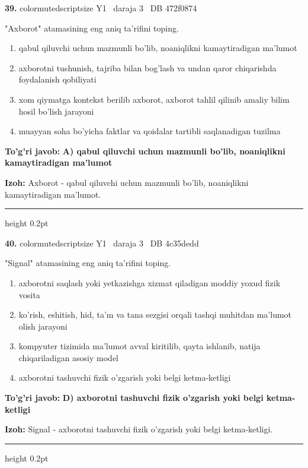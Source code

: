 \documentclass[10pt,a4paper,oneside]{article}
\begin{document}
\noindent\textbf{\color{ink}39.}  {color{muted}scriptsize Y1 \textbullet\ daraja 3 \textbullet\ DB 472f0874}
\par
"Axborot" atamasining eng aniq ta'rifini toping.
\begin{enumerate}[label=\Alph*),leftmargin=9mm]
\item qabul qiluvchi uchun mazmunli bo'lib, noaniqlikni kamaytiradigan ma'lumot
\item axborotni tushunish, tajriba bilan bog'lash va undan qaror chiqarishda foydalanish qobiliyati
\item xom qiymatga kontekst berilib axborot, axborot tahlil qilinib amaliy bilim hosil bo'lish jarayoni
\item muayyan soha bo'yicha faktlar va qoidalar tartibli saqlanadigan tuzilma
\end{enumerate}
\begin{tcolorbox}[enhanced,breakable,colback=teal!4,colframe=teal!50!black,boxrule=0.5pt,arc=1.1mm,left=3mm,right=3mm,top=1.7mm,bottom=1.7mm,before skip=2mm,after skip=2mm]
\textbf{\color{teal}To'g'ri javob:} \textbf{A) qabul qiluvchi uchun mazmunli bo'lib, noaniqlikni kamaytiradigan ma'lumot}
\par\smallskip
\textbf{Izoh:} Axborot - qabul qiluvchi uchun mazmunli bo'lib, noaniqlikni kamaytiradigan ma'lumot.
\end{tcolorbox}
\vspace{2mm}\hrule height 0.2pt \vspace{3mm}

\noindent\textbf{\color{ink}40.}  {color{muted}scriptsize Y1 \textbullet\ daraja 3 \textbullet\ DB 4c35dedd}
\par
"Signal" atamasining eng aniq ta'rifini toping.
\begin{enumerate}[label=\Alph*),leftmargin=9mm]
\item axborotni saqlash yoki yetkazishga xizmat qiladigan moddiy yoxud fizik vosita
\item ko'rish, eshitish, hid, ta'm va tana sezgisi orqali tashqi muhitdan ma'lumot olish jarayoni
\item kompyuter tizimida ma'lumot avval kiritilib, qayta ishlanib, natija chiqariladigan asosiy model
\item axborotni tashuvchi fizik o'zgarish yoki belgi ketma-ketligi
\end{enumerate}
\begin{tcolorbox}[enhanced,breakable,colback=teal!4,colframe=teal!50!black,boxrule=0.5pt,arc=1.1mm,left=3mm,right=3mm,top=1.7mm,bottom=1.7mm,before skip=2mm,after skip=2mm]
\textbf{\color{teal}To'g'ri javob:} \textbf{D) axborotni tashuvchi fizik o'zgarish yoki belgi ketma-ketligi}
\par\smallskip
\textbf{Izoh:} Signal - axborotni tashuvchi fizik o'zgarish yoki belgi ketma-ketligi.
\end{tcolorbox}
\vspace{2mm}\hrule height 0.2pt \vspace{3mm}
\end{document}
